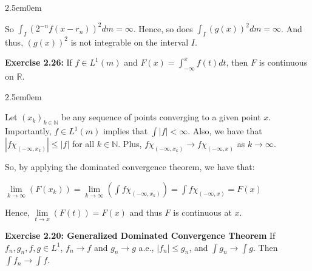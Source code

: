 \documentclass{book}
\newcommand{\exTwoP}{%
   \color{RedViolet}%
   \fontsize{13}{15}\selectfont%
}
\newenvironment{myIndent}{%
   \begin{adjustwidth}{2.5em}{0em}%
}{%
   \end{adjustwidth}%
}
\newcommand{\blab}[1]{\textbf{#1}}
\newcommand{\retTwo}{\hfill\bigbreak}
\begin{document}
\begin{enumerate}
\begin{myIndent}
      So $\int_I (2^{-n}f(x - r_n))^2 dm = \infty$. Hence, so does $\int_I(g(x))^2dm = \infty$. And thus, $(g(x))^2$ is not integrable on the interval $I$.
      \retTwo
   \end{myIndent}
\end{enumerate}

\retTwo

\blab{Exercise 2.26:} If $f \in L^1(m)$ and $F(x) = \int_{-\infty}^x f(t)dt$, then $F$ is continuous on $\mathbb{R}$.

\begin{myIndent}\exTwoP
   Let $(x_k)_{k \in \mathbb{N}}$ be any sequence of points converging to a given point $x$. Importantly, $f \in L^1(m)$ implies that $\int |f| < \infty$. Also,  we have that $|f\chi_{(-\infty, x_k)}| \leq |f|$ for all $k \in \mathbb{N}$. Plus, $f\chi_{(-\infty, x_k)} \rightarrow f\chi_{(-\infty, x)}$ as $k \rightarrow \infty$.\retTwo

   So, by applying the dominated convergence theorem, we have that:

   {\centering $\lim\limits_{k \rightarrow \infty}(F(x_k)) = \lim\limits_{k\rightarrow \infty} (\int f\chi_{(-\infty, x_k)}) = \int f\chi_{(-\infty, x)} = F(x)$\retTwo\par}

   Hence, $\lim\limits_{t \rightarrow x}(F(t)) = F(x)$ and thus $F$ is continuous at $x$.
\end{myIndent}

\newpage

\blab{Exercise 2.20: Generalized Dominated Convergence Theorem} If $f_n, g_n, f, g \in L^1$, $f_n \rightarrow f$ and $g_n \rightarrow g$ a.e., $|f_n| \leq g_n$, and $\int g_n \rightarrow \int g$. Then $\int f_n \rightarrow \int f$.\\ [-12pt]
\end{document}
